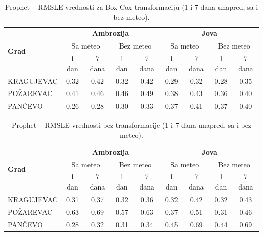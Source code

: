 \documentclass[12pt]{article}
\begin{document}
\begin{table}[h!]
\centering
\caption{Prophet – RMSLE vrednosti za Box-Cox transformaciju (1 i 7 dana unapred, sa i bez meteo).}
\label{tab:prophet_rmsle_boxcox}
\begin{tabular}{|l|c|c|c|c||c|c|c|c|}
\hline
\multirow{3}{*}{\textbf{Grad}} 
& \multicolumn{4}{c||}{\textbf{Ambrozija}} 
& \multicolumn{4}{c|}{\textbf{Jova}} \\ \cline{2-9}
& \multicolumn{2}{c|}{Sa meteo} & \multicolumn{2}{c||}{Bez meteo} 
& \multicolumn{2}{c|}{Sa meteo} & \multicolumn{2}{c|}{Bez meteo} \\ \cline{2-9}
& 1 dan & 7 dana & 1 dan & 7 dana & 1 dan & 7 dana & 1 dan & 7 dana \\ \hline
KRAGUJEVAC & 0.32 & 0.42 & 0.32 & 0.42 & 0.29 & 0.32 & 0.28 & 0.35 \\ \hline
POŽAREVAC  & 0.41 & 0.46 & 0.46 & 0.49 & 0.38 & 0.43 & 0.36 & 0.40 \\ \hline
PANČEVO    & 0.26 & 0.28 & 0.30 & 0.33 & 0.37 & 0.41 & 0.37 & 0.40 \\ \hline
\end{tabular}
\end{table}

\begin{table}[h!]
\centering
\caption{Prophet – RMSLE vrednosti bez transformacije (1 i 7 dana unapred, sa i bez meteo).}
\label{tab:prophet_rmsle_none}
\begin{tabular}{|l|c|c|c|c||c|c|c|c|}
\hline
\multirow{3}{*}{\textbf{Grad}} 
& \multicolumn{4}{c||}{\textbf{Ambrozija}} 
& \multicolumn{4}{c|}{\textbf{Jova}} \\ \cline{2-9}
& \multicolumn{2}{c|}{Sa meteo} & \multicolumn{2}{c||}{Bez meteo} 
& \multicolumn{2}{c|}{Sa meteo} & \multicolumn{2}{c|}{Bez meteo} \\ \cline{2-9}
& 1 dan & 7 dana & 1 dan & 7 dana & 1 dan & 7 dana & 1 dan & 7 dana \\ \hline
KRAGUJEVAC & 0.31 & 0.37 & 0.32 & 0.36 & 0.32 & 0.42 & 0.32 & 0.43 \\ \hline
POŽAREVAC  & 0.63 & 0.69 & 0.57 & 0.63 & 0.37 & 0.51 & 0.31 & 0.46 \\ \hline
PANČEVO    & 0.28 & 0.32 & 0.31 & 0.34 & 0.45 & 0.69 & 0.44 & 0.69 \\ \hline
\end{tabular}
\end{table}
\end{document}
